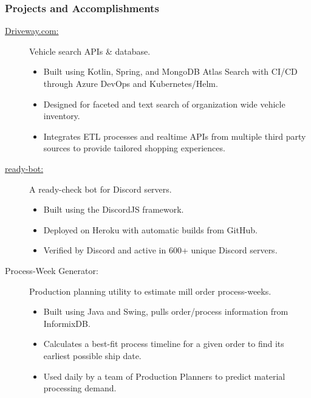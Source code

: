 \documentclass{article}
\begin{document}
\subsubsection*{Projects and Accomplishments}
    \begin{description}

        \item[\href{https://driveway.com/shop}{Driveway.com:\hspace{0.075in}}] Vehicle search APIs \& database.
            \begin{itemize}
                \item Built using Kotlin, Spring, and MongoDB Atlas Search with CI/CD through Azure DevOps and Kubernetes/Helm.
                \item Designed for faceted and text search of organization wide vehicle inventory.
                \item Integrates ETL processes and realtime APIs from multiple third party sources to provide tailored shopping experiences.
            \end{itemize}

            \vspace{0.5em}
        \item[\href{https://www.github.com/BurnsCommaLucas/ready-bot}{ready-bot:\hspace{0.075in}}] A ready-check bot for Discord servers.
            \begin{itemize}
                \item Built using the DiscordJS framework.
                \item Deployed on Heroku with automatic builds from GitHub.
                \item Verified by Discord and active in 600+ unique Discord servers.
            \end{itemize}

            \vspace{0.5em}

        \item[Process-Week Generator:] Production planning utility to estimate mill order process-weeks.
            \begin{itemize}
                \item Built using Java and Swing, pulls order/process information from InformixDB.
                \item Calculates a best-fit process timeline for a given order to find its earliest possible ship date.
                \item Used daily by a team of Production Planners to predict material processing demand.
            \end{itemize}


\end{description}
\end{document}
